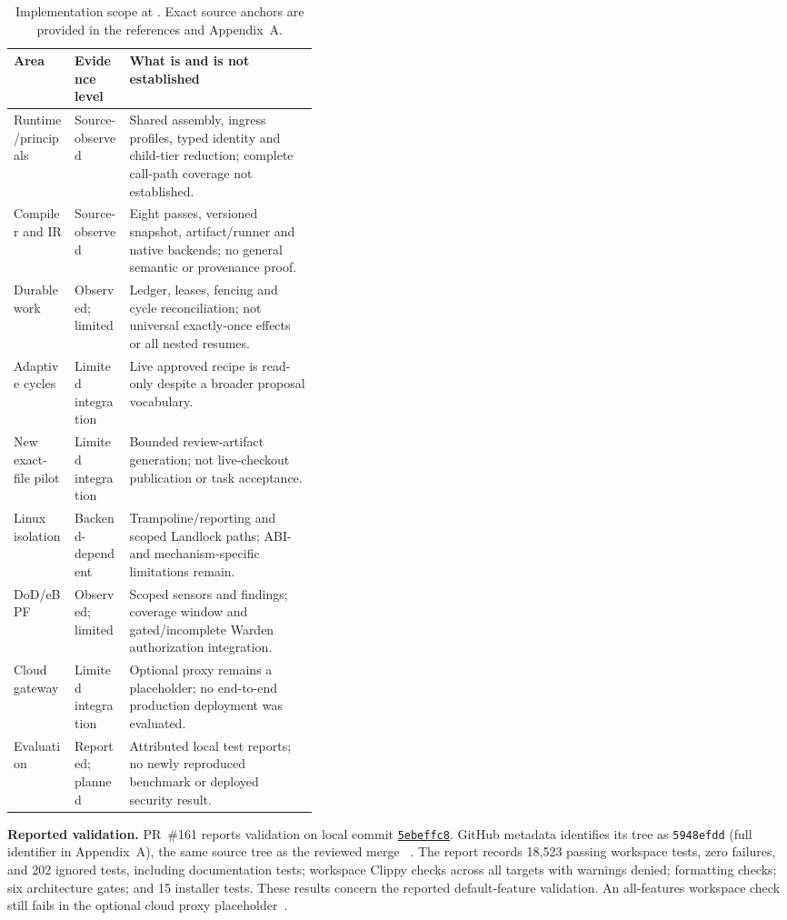 \begin{table}[htbp]
\centering
\small
\renewcommand{\arraystretch}{1.16}
\begin{tabularx}{\linewidth}{@{}>{\raggedright\arraybackslash}p{0.205\linewidth} >{\raggedright\arraybackslash}p{0.185\linewidth} >{\raggedright\arraybackslash}X@{}}
\toprule
\textbf{Area} & \textbf{Evidence level} & \textbf{What is and is not established} \\
\midrule
Runtime/principals & Source-observed & Shared assembly, ingress profiles, typed identity and child-tier reduction; complete call-path coverage not established. \\
Compiler and IR & Source-observed & Eight passes, versioned snapshot, artifact/runner and native backends; no general semantic or provenance proof. \\
Durable work & Observed; limited & Ledger, leases, fencing and cycle reconciliation; not universal exactly-once effects or all nested resumes. \\
Adaptive cycles & Limited integration & Live approved recipe is read-only despite a broader proposal vocabulary. \\
New exact-file pilot & Limited integration & Bounded review-artifact generation; not live-checkout publication or task acceptance. \\
Linux isolation & Backend-dependent & Trampoline/reporting and scoped Landlock paths; ABI- and mechanism-specific limitations remain. \\
DoD/eBPF & Observed; limited & Scoped sensors and findings; coverage window and gated/incomplete Warden authorization integration. \\
Cloud gateway & Limited integration & Optional proxy remains a placeholder; no end-to-end production deployment was evaluated. \\
Evaluation & Reported; planned & Attributed local test reports; no newly reproduced benchmark or deployed security result. \\
\bottomrule
\end{tabularx}
\caption{Implementation scope at \artifactshort{}. Exact source anchors are provided in the references and Appendix~A.}
\label{tab:implementation-status}
\end{table}

\textbf{Reported validation.} PR~\#161 reports validation on local commit \href{https://github.com/mm9942/Harwness/commit/5ebeffc87bac7e3bac4fdaac1ee81de2fca08c91}{\texttt{5ebeffc8}}. GitHub metadata identifies its tree as \texttt{5948efdd} (full identifier in Appendix~A), the same source tree as the reviewed merge \artifactshort{}~\cite{ref59,ref60}. The report records 18,523 passing workspace tests, zero failures, and 202 ignored tests, including documentation tests; workspace Clippy checks across all targets with warnings denied; formatting checks; six architecture gates; and 15 installer tests. These results concern the reported default-feature validation. An all-features workspace check still fails in the optional cloud proxy placeholder~\cite{ref59}.

